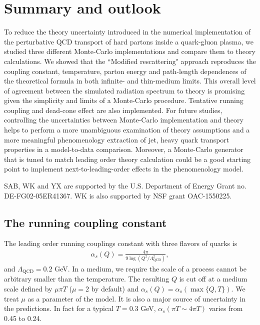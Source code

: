 \documentclass[aps, prc, reprint, amsmath, groupedaddress, nofootinbib]{revtex4-1}
\begin{document}
{%


\section{Summary and outlook}\label{section:summary}
To reduce the theory uncertainty introduced in the numerical implementation of the perturbative QCD transport of hard partons inside a quark-gluon plasma, we studied three different Monte-Carlo implementations and compare them to theory calculations.
We showed that the ``Modified rescattering" approach reproduces the coupling constant, temperature, parton energy and path-length dependences of the theoretical formula in both infinite- and thin-medium limits.
This overall level of agreement between the simulated radiation spectrum to theory is promising given the simplicity and limits of a Monte-Carlo procedure. 
Tentative running coupling and dead-cone effect are also implemented.
For future studies, controlling the uncertainties between Monte-Carlo implementation and theory helps to perform a more unambiguous examination of theory assumptions and a more meaningful phenomenology extraction of jet, heavy quark transport properties in a model-to-data comparison.
Moreover, a Monte-Carlo generator that is tuned to match leading order theory calculation could be a good starting point to implement next-to-leading-order effects in the phenomenology model.


\begin{acknowledgments}
SAB, WK and YX are supported by the U.S. Department of Energy Grant no. DE-FG02-05ER41367. WK is also supported by NSF grant OAC-1550225.
\end{acknowledgments}

\begin{appendices}
\section{The running coupling constant}\label{app:alphas}
The leading order running couplings constant with three flavors of quarks is
\begin{eqnarray}
\alpha_s(Q) = \frac{4\pi}{9\log(Q^2/\Lambda_{\textrm{QCD}}^2)},
\end{eqnarray}
and $\Lambda_{\textrm{QCD}} = 0.2$ GeV. In a medium, we require the scale of a process cannot be arbitrary smaller than the temperature. The resulting $Q$ is cut off at a medium scale defined by $\mu\pi T$ ($\mu=2$ by default) and $\alpha_s(Q) = \alpha_s(\max\{Q,T\})$. We treat $\mu$ as a parameter of the model. It is also a major source of uncertainty in the predictions. In fact for a typical $T=0.3$ GeV, $\alpha_s(\pi T \sim 4\pi T)$ varies from 0.45 to 0.24.


\end{appendices}}
\end{document}

